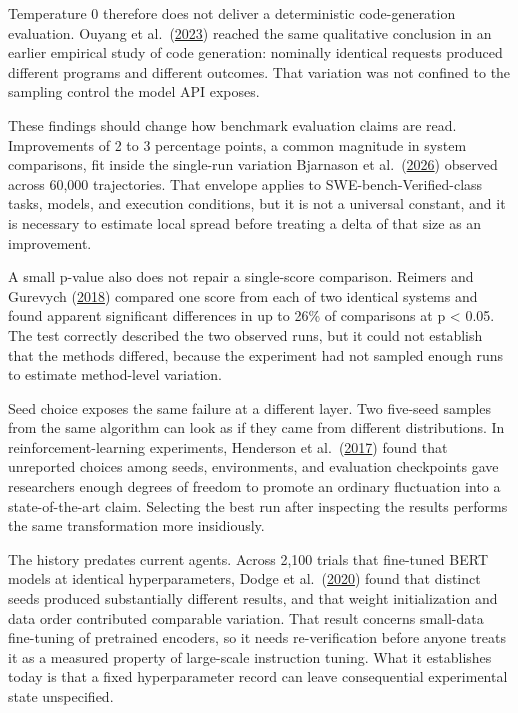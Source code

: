 Temperature 0 therefore does not deliver a deterministic code-generation evaluation. Ouyang et al.~(\href{https://arxiv.org/abs/2308.02828}{2023}) reached the same qualitative conclusion in an earlier empirical study of code generation: nominally identical requests produced different programs and different outcomes. That variation was not confined to the sampling control the model API exposes.

These findings should change how benchmark evaluation claims are read. Improvements of 2 to 3 percentage points, a common magnitude in system comparisons, fit inside the single-run variation Bjarnason et al.~(\href{https://arxiv.org/abs/2602.07150}{2026}) observed across 60,000 trajectories. That envelope applies to SWE-bench-Verified-class tasks, models, and execution conditions, but it is not a universal constant, and it is necessary to estimate local spread before treating a delta of that size as an improvement.

A small p-value also does not repair a single-score comparison. Reimers and Gurevych (\href{https://arxiv.org/abs/1803.09578}{2018}) compared one score from each of two identical systems and found apparent significant differences in up to 26\% of comparisons at p \textless{} 0.05. The test correctly described the two observed runs, but it could not establish that the methods differed, because the experiment had not sampled enough runs to estimate method-level variation.

Seed choice exposes the same failure at a different layer. Two five-seed samples from the same algorithm can look as if they came from different distributions. In reinforcement-learning experiments, Henderson et al.~(\href{https://arxiv.org/abs/1709.06560}{2017}) found that unreported choices among seeds, environments, and evaluation checkpoints gave researchers enough degrees of freedom to promote an ordinary fluctuation into a state-of-the-art claim. Selecting the best run after inspecting the results performs the same transformation more insidiously.

The history predates current agents. Across 2,100 trials that fine-tuned BERT models at identical hyperparameters, Dodge et al.~(\href{https://arxiv.org/abs/2002.06305}{2020}) found that distinct seeds produced substantially different results, and that weight initialization and data order contributed comparable variation. That result concerns small-data fine-tuning of pretrained encoders, so it needs re-verification before anyone treats it as a measured property of large-scale instruction tuning. What it establishes today is that a fixed hyperparameter record can leave consequential experimental state unspecified.

